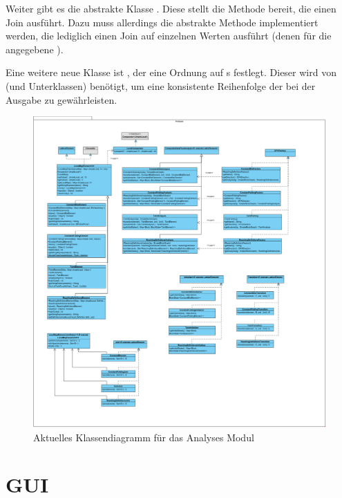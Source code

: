 Weiter gibt es die abstrakte Klasse .
Diese stellt die Methode  bereit, die einen Join ausführt.
Dazu muss allerdings die abstrakte Methode  implementiert werden, die lediglich einen Join auf einzelnen Werten ausführt (denen für die angegebene ).

Eine weitere neue Klasse ist , der eine Ordnung auf s festlegt. Dieser wird von  (und Unterklassen) benötigt, um eine konsistente Reihenfolge der  bei der Ausgabe zu gewährleisten.

\begin{figure}[H]
	\caption{Aktuelles Klassendiagramm für das Analyses Modul}
	\centering
	\includegraphics[width=1.0\textwidth]{Aenderungen/Klassendiagramme/Analyses_Impl.png}
\end{figure}

\section{GUI}

